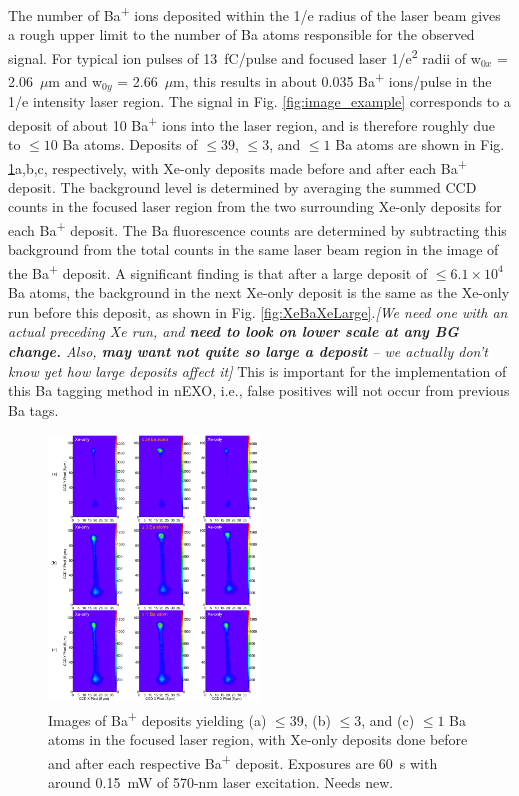 \documentclass[aps,pra,reprint,superscriptaddress]{revtex4-1}
\begin{document}
The number of Ba\textsuperscript{+} ions deposited within the 1/e radius of the laser beam gives a rough upper limit to the number of Ba atoms responsible for the observed signal.  For typical ion pulses of 13~fC/pulse and focused laser 1/e\textsuperscript{2} radii of w$_{0x}$ = 2.06~$\mu$m and w$_{0y}$ = 2.66~$\mu$m, this results in about 0.035 Ba\textsuperscript{+} ions/pulse in the 1/e intensity laser region.  The signal in Fig. \ref{fig:image_example} corresponds to a deposit of about 10 Ba\textsuperscript{+} ions into the laser region, and is therefore roughly due to $\leq 10$ Ba atoms.  Deposits of $\leq 39$, $\leq 3$, and $\leq 1$ Ba atoms are shown in Fig. \ref{fig:XeBaXe}a,b,c, respectively, with Xe-only deposits made before and after each Ba\textsuperscript{+} deposit.  The background level is determined by averaging the summed CCD counts in the focused laser region from the two surrounding Xe-only deposits for each Ba\textsuperscript{+} deposit.  The Ba fluorescence counts are determined by subtracting this background from the total counts in the same laser beam region in the image of the Ba\textsuperscript{+} deposit.  A significant finding is that {\color{gray}after a large deposit of $\leq 6.1 \times 10^4$ Ba atoms, the background in the next Xe-only deposit is the same as the Xe-only run before this deposit, as shown in Fig. \ref{fig:XeBaXeLarge}.\emph{[We need one with an actual preceding Xe run, and \textbf{need to look on lower scale at any BG change.} Also, \textbf{may want not quite so large a deposit} -- we actually don't know yet how large deposits affect it]}}  This is important for the implementation of this Ba tagging method in nEXO, i.e., false positives will not occur from previous Ba tags.

\begin{figure}
\includegraphics[width=0.5\textwidth]{figures/xebaxe_instantaneous_scrunched.png}
\caption{Images of Ba\textsuperscript{+} deposits yielding (a) $\leq 39$, (b) $\leq 3$, and (c) $\leq 1$ Ba atoms in the focused laser region, with Xe-only deposits done before and after each respective Ba\textsuperscript{+} deposit.  Exposures are 60~s with around 0.15~mW of 570-nm laser excitation. {\color{gray}Needs new.}}
\label{fig:XeBaXe}
\end{figure}
\end{document}
